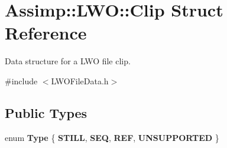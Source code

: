 \hypertarget{struct_assimp_1_1_l_w_o_1_1_clip}{\section{Assimp\+:\+:L\+W\+O\+:\+:Clip Struct Reference}
\label{struct_assimp_1_1_l_w_o_1_1_clip}
}


Data structure for a L\+W\+O file clip.  




{\ttfamily \#include $<$L\+W\+O\+File\+Data.\+h$>$}

\subsection*{Public Types}
\begin{DoxyCompactItemize}
\item 
\hypertarget{struct_assimp_1_1_l_w_o_1_1_clip_af5698c5013fd56c5101a9516435fe713}{enum {\bfseries Type} \{ {\bfseries S\+T\+I\+L\+L}, 
{\bfseries S\+E\+Q}, 
{\bfseries R\+E\+F}, 
{\bfseries U\+N\+S\+U\+P\+P\+O\+R\+T\+E\+D}
 \}}\label{struct_assimp_1_1_l_w_o_1_1_clip_af5698c5013fd56c5101a9516435fe713}

\end{DoxyCompactItemize}
